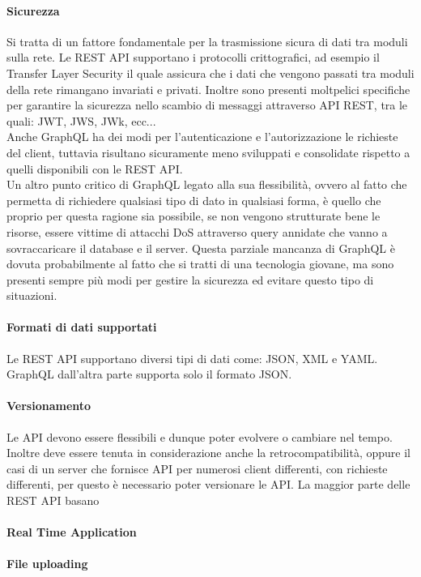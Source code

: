 \paragraph{Sicurezza}
Si tratta di un fattore fondamentale per la trasmissione sicura di dati tra moduli sulla rete. Le REST API supportano i protocolli crittografici, ad esempio il Transfer Layer Security il quale assicura che i dati che vengono passati tra moduli della rete rimangano invariati e privati. Inoltre sono presenti moltpelici specifiche per garantire la sicurezza nello scambio di messaggi attraverso API REST, tra le quali: JWT, JWS, JWk, ecc...\\
Anche GraphQL ha dei modi per l'autenticazione e l'autorizzazione le richieste del client, tuttavia risultano sicuramente meno sviluppati e consolidate rispetto a quelli disponibili con le REST API.\\
Un altro punto critico di GraphQL legato alla sua flessibilità, ovvero al fatto che permetta di richiedere qualsiasi tipo di dato in qualsiasi forma, è quello che proprio per questa ragione sia possibile, se non vengono strutturate bene le risorse, essere vittime di attacchi DoS attraverso query annidate che vanno a sovraccaricare il database e il server. Questa parziale mancanza di GraphQL è dovuta probabilmente al fatto che si tratti di una tecnologia giovane, ma sono presenti sempre più modi per gestire la sicurezza ed evitare questo tipo di situazioni.
\paragraph{Formati di dati supportati}
Le REST API supportano diversi tipi di dati come: JSON, XML e YAML. GraphQL dall'altra parte supporta solo il formato JSON.
\paragraph{Versionamento}
Le API devono essere flessibili e dunque poter evolvere o cambiare nel tempo. Inoltre deve essere tenuta in considerazione anche la retrocompatibilità, oppure il casi di un server che fornisce API per numerosi client differenti, con richieste differenti, per questo è necessario poter versionare le API.
La maggior parte delle REST API basano
\paragraph{Real Time Application}
\paragraph{File uploading}
